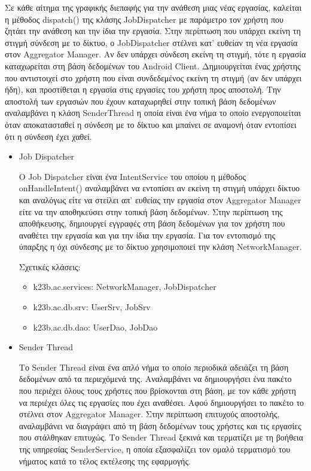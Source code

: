 \documentclass[a4paper,11pt]{article}
\begin{document}
\begin{sloppypar}
Σε κάθε αίτημα της γραφικής διεπαφής για την ανάθεση μιας νέας εργασίας, καλείται η μέθοδος dispatch() της κλάσης JobDispatcher με παράμετρο τον χρήστη που ζητάει την ανάθεση και την ίδια την εργασία. Στην περίπτωση που υπάρχει εκείνη τη στιγμή σύνδεση με το δίκτυο, ο JobDispatcher στέλνει κατ' ευθείαν τη νέα εργασία στον Aggregator Manager. Αν δεν υπάρχει σύνδεση εκείνη τη στιγμή, τότε η εργασία καταχωρείται στη βάση δεδομένων του Android Client. Δημιουργείται ένας χρήστης που αντιστοιχεί στο χρήστη που είναι συνδεδεμένος εκείνη τη στιγμή (αν δεν υπάρχει ήδη), και προστίθεται η εργασία στις εργασίες του χρήστη προς αποστολή. Την αποστολή των εργασιών που έχουν καταχωρηθεί στην τοπική βάση δεδομένων αναλαμβάνει η κλάση SenderThread η οποία είναι ένα νήμα το οποίο ενεργοποιείται όταν αποκατασταθεί η σύνδεση με το δίκτυο και μπαίνει σε αναμονή όταν εντοπίσει ότι η σύνδεση έχει χαθεί.

\newpage

\begin{itemize}

\item{Job Dispatcher}

Ο Job Dispatcher είναι ένα IntentService του οποίου η μέθοδος onHandleIntent() αναλαμβάνει να εντοπίσει αν εκείνη τη στιγμή υπάρχει δίκτυο και αναλόγως είτε να στείλει απ' ευθείας την εργασία στον Aggregator Manager είτε να την αποθηκεύσει στην τοπική βάση δεδομένων. Στην περίπτωση της αποθήκευσης, δημιουργεί εγγραφές στη βάση δεδομένων για τον χρήστη που αναθέτει την εργασία και για την ίδια την εργασία. Για τον εντοπισμό της ύπαρξης η όχι σύνδεσης με το δίκτυο χρησιμοποιεί την κλάση NetworkManager.

Σχετικές κλάσεις:

\begin{itemize}

\item k23b.ac.services: NetworkManager, JobDispatcher

\item k23b.ac.db.srv: UserSrv, JobSrv

\item k23b.ac.db.dao: UserDao, JobDao

\end{itemize}

\item{Sender Thread}

Το Sender Thread είναι ένα απλό νήμα το οποίο περιοδικά αδειάζει τη βάση δεδομένων από τα περιεχόμενά της. Αναλαμβάνει να δημιουργήσει ένα πακέτο που περιέχει όλους τους χρήστες που βρίσκονται στη βάση, με τον κάθε χρήστη να περιέχει όλες τις εργασίες που έχει αναθέσει. Αφού δημιουργήσει το πακέτο το στέλνει στον Aggregator Manager. Στην περίπτωση επιτυχούς αποστολής, αναλαμβάνει να διαγράψει από τη βάση δεδομένων τους χρήστες και τις εργασίες που στάλθηκαν επιτυχώς. Το Sender Thread ξεκινά και τερματίζει με τη βοήθεια της υπηρεσίας SenderService, η οποία εξασφαλίζει τον ομαλό τερματισμό του νήματος κατά το τέλος εκτέλεσης της εφαρμογής.


\end{itemize}
\end{sloppypar}
\end{document}
